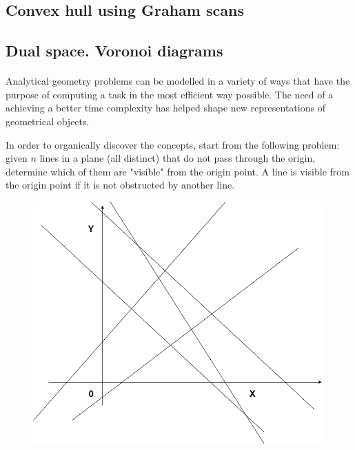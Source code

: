 \documentclass[letterpaper]{article}
\begin{document}
\newpage

\subsection{Convex hull using Graham scans}

\newpage

\subsection{Dual space. Voronoi diagrams}

\paragraph{}

Analytical geometry problems can be modelled in a variety of ways that have the purpose of computing a task in the most efficient way possible. The need of a achieving a better time complexity has helped shape new representations of geometrical objects.

In order to organically discover the concepts, start from the following problem: given $n$ lines in a plane (all distinct) that do not pass through the origin, determine which of them are "visible" from the origin point. A line is visible from the origin point if it is not obstructed by another line.

\begin{figure} [h!]
\centering
\includegraphics[width=1\textwidth]{pngOfDiagrams/dual1.png}
\end{figure}
\end{document}
